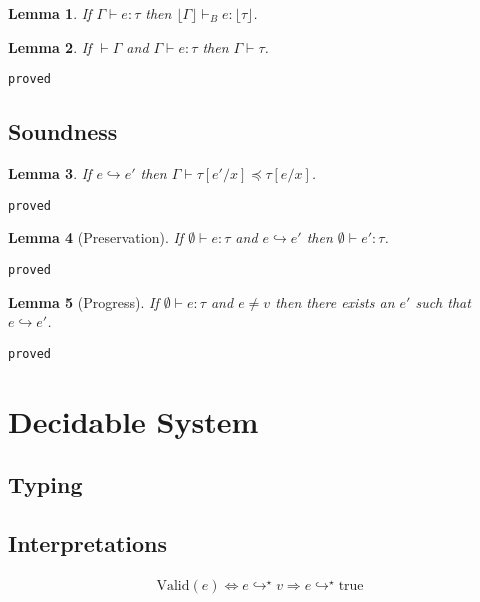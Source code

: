 \documentclass[10pt,a4paper]{article}
\newcommand{\isDecidable}{false} %
\newtheorem{lemma}{Lemma}
\newcommand\showproof[1]{\texttt{proved}}
\newcommand\etrue{\ensuremath{\text{true}}}
\newcommand\valid[1]{\ensuremath{\text{Valid}(#1)}}
\newcommand\sub[2]{\ensuremath{\left[ #2 / #1 \right]}}
\newcommand\erase[1]{\ensuremath{\lfloor #1 \rfloor}}
\newcommand\eval[2]{\ensuremath{#1 \hookrightarrow #2}}
\newcommand\evals[2]{\ensuremath{#1 \hookrightarrow^\star #2}}
\newcommand\hastype[3]{\ensuremath{#1 \vdash #2 : #3}}
\newcommand\hastypebase[3]{\ensuremath{#1 \vdash_B #2 : #3}}
\newcommand\iswellformed[2]{\ensuremath{#1 \vdash #2}}
\newcommand\issubtype[3]{\ensuremath{#1 \vdash #2 \preceq #3}}
\begin{document}
\begin{lemma}\label{lemma:erase} %
If \hastype{\Gamma}{e}{\tau} 
then \hastypebase{\erase{\Gamma}}{e}{\erase{\tau}}.
\end{lemma}


\begin{lemma}\label{lemma:wellformed}
If \iswellformed{}{\Gamma} and \hastype{\Gamma}{e}{\tau} then \iswellformed{\Gamma}{\tau}.
\end{lemma}
\showproof{
	\begin{proof}
	
	\end{proof}
}

\subsection{Soundness}
\begin{lemma}\label{lemma:eval}
If \eval{e}{e'} then \issubtype{\Gamma}{\tau\sub{x}{e'}}{\tau\sub{x}{e}}.
\end{lemma}
\showproof{
	\begin{proof}
	
	\end{proof}
}

\begin{lemma}[Preservation]\label{lemma:preservation}
If \hastype{\emptyset}{e}{\tau} and \eval{e}{e'} then \hastype{\emptyset}{e'}{\tau}.
\end{lemma}
\showproof{
	\begin{proof}
	
	\end{proof}
}
\begin{lemma}[Progress]\label{lemma:progress}
If \hastype{\emptyset}{e}{\tau} and $e \neq v$ then there exists an $e'$ such that \eval{e}{e'}.
\end{lemma}
\showproof{
	\begin{proof}
	
	\end{proof}
}

\renewcommand{\isDecidable}{true} %

\section{Decidable System}
\subsection*{Typing}


\subsection{Interpretations}
\begin{align*}
\valid{e} \Leftrightarrow \evals{e}{v}\Rightarrow\evals{e}{\etrue}
\end{align*}
\end{document}
